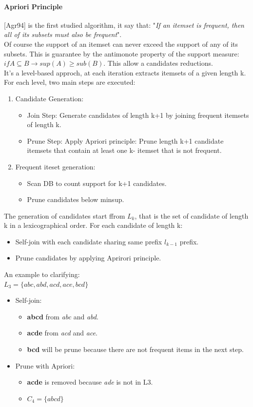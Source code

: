 \documentclass[12pt]{article}
\begin{document}
\paragraph{Apriori Principle} [Agr94] is the first studied algorithm, it say that: "\textit{If an itemset is frequent, then all of its subsets must also be frequent}".\\
Of course the support of an itemset can never exceed the support of any of its subsets. This is guarantee by the antimonote property of the support measure: $if A \subseteq B \rightarrow sup(A) \geq sub(B)$. This allow a candidates reductions.\\
It's a level-based approch, at each iteration extracts itemsets of a given length k. For each level, two main steps are executed:
\begin{enumerate}
  \item Candidate Generation:
  \begin{itemize}
    \item Join Step: Generate candidates of length k+1 by joining frequent itemsets of length k.
    \item Prune Step: Apply Apriori principle: Prune length k+1 candidate itemsets that contain at least one k- itemset that is not frequent.
  \end{itemize}
  \item Frequent iteset generation:
  \begin{itemize}
    \item Scan DB to count support for k+1 candidates.
    \item Prune candidates below minsup.
  \end{itemize}
\end{enumerate}
The generation of candidates start ffrom $L_k$, that is the set of candidate of length k in a lexicographical order. For each candidate of length k:
\begin{itemize}
  \item Self-join with each candidate sharing same prefix $l_{k-1}$ prefix.
  \item Prune candidates by applying Aprirori principle.
\end{itemize}
An example to clarifying:\\
$L_3 = \{abc, abd, acd, ace, bcd\}$
\begin{itemize}
  \item Self-join:
  \begin{itemize}
    \item \textbf{abcd} from \textit{abc} and \textit{abd}.
    \item \textbf{acde} from \textit{acd} and \textit{ace}.
    \item \textbf{bcd} will be prune because there are not frequent items in the next step.
  \end{itemize}
  \item Prune with Apriori:
  \begin{itemize}
    \item \textbf{acde} is removed because \textit{ade} is not in L3.
    \item $C_4 = \{abcd\}$
  \end{itemize}
\end{itemize}
\end{document}
